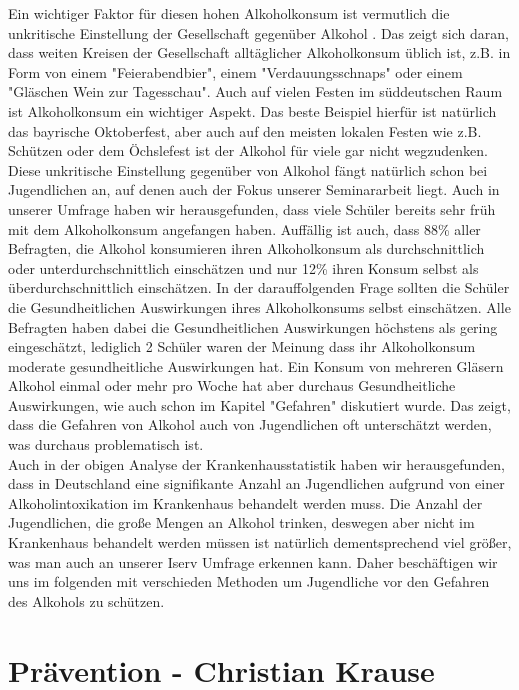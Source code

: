 \documentclass[12pt]{article}
\begin{document}
Ein wichtiger Faktor für diesen hohen Alkoholkonsum ist vermutlich die unkritische Einstellung der Gesellschaft gegenüber Alkohol \autocite{noauthor_alkoholkonsum_nodate}. Das zeigt sich daran, dass weiten Kreisen der Gesellschaft alltäglicher Alkoholkonsum üblich ist, z.B. in Form von einem "Feierabendbier", einem "Verdauungsschnaps" oder einem "Gläschen Wein zur Tagesschau". Auch auf vielen Festen im süddeutschen Raum ist Alkoholkonsum ein wichtiger Aspekt. Das beste Beispiel hierfür ist natürlich das bayrische Oktoberfest, aber auch auf den meisten lokalen Festen wie z.B. Schützen oder dem Öchslefest ist der Alkohol für viele gar nicht wegzudenken. Diese unkritische Einstellung gegenüber von Alkohol fängt natürlich schon bei Jugendlichen an, auf denen auch der Fokus unserer Seminararbeit liegt. Auch in unserer Umfrage haben wir herausgefunden, dass viele Schüler bereits sehr früh mit dem Alkoholkonsum angefangen haben. Auffällig ist auch, dass 88\% aller Befragten, die Alkohol konsumieren ihren Alkoholkonsum als durchschnittlich oder unterdurchschnittlich einschätzen und nur 12\% ihren Konsum selbst als überdurchschnittlich einschätzen. In der darauffolgenden Frage sollten die Schüler die Gesundheitlichen Auswirkungen ihres Alkoholkonsums selbst einschätzen. Alle Befragten haben dabei die Gesundheitlichen Auswirkungen höchstens als gering eingeschätzt, lediglich 2 Schüler waren der Meinung dass ihr Alkoholkonsum moderate gesundheitliche Auswirkungen hat. Ein Konsum von mehreren Gläsern Alkohol einmal oder mehr pro Woche hat aber durchaus Gesundheitliche Auswirkungen, wie auch schon im Kapitel "Gefahren" diskutiert wurde. Das zeigt, dass die Gefahren von Alkohol auch von Jugendlichen oft unterschätzt werden, was durchaus problematisch ist.\\
Auch in der obigen Analyse der Krankenhausstatistik haben wir herausgefunden, dass in Deutschland eine signifikante Anzahl an Jugendlichen aufgrund von einer Alkoholintoxikation im Krankenhaus behandelt werden muss. Die Anzahl der Jugendlichen, die große Mengen an Alkohol trinken, deswegen aber nicht im Krankenhaus behandelt werden müssen ist natürlich dementsprechend viel größer, was man auch an unserer Iserv Umfrage erkennen kann. %
Daher beschäftigen wir uns im folgenden mit verschieden Methoden um Jugendliche vor den Gefahren des Alkohols zu schützen. 


\section{Prävention \footnotesize{- Christian Krause}}
\end{document}
